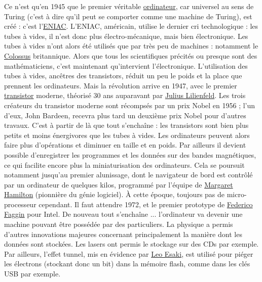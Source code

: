 \documentclass[10pt]{article}
\begin{document}
Ce n'est qu'en 1945 que le premier véritable \href{https://fr.wikipedia.org/wiki/Ordinateur}{ordinateur},
car universel au sens de Turing (c'est à dire qu'il peut se comporter comme une machine de Turing),
est créé : c'est l'\href{https://fr.wikipedia.org/wiki/ENIAC}{ENIAC}. L'ENIAC, américain, utilise le dernier cri technologique : les tubes à vides, il n'est
donc plus électro-mécanique, mais bien électronique. Les tubes à vides n'ont alors été utilisés que par très peu de machines : notamment
le \href{https://fr.wikipedia.org/wiki/Colossus_(ordinateur)}{Colossus} britannique.
Alors que tous les scientifiques précités ou presque sont des mathématiciens, c'est maintenant qu'intervient l'électronique.
L'utilisation des tubes à vides, ancêtres des transistors, réduit un peu le poids et la place que prennent les ordinateurs.
Mais la révolution arrive en 1947, avec le premier \href{https://fr.wikipedia.org/wiki/Transistor}{transistor} moderne, théorisé 30 ans auparavant
par \href{https://fr.wikipedia.org/wiki/Julius_Edgar_Lilienfeld}{Julius Lilienfeld}. Les trois créateurs du transistor moderne sont
récompsés par un prix Nobel en 1956 ; l'un d'eux, John Bardeen, recevra plus tard un deuxième prix Nobel pour d'autres travaux.
C'est à partir de là que tout s'enchaîne : les transistors sont bien plus petits et moins énergivores que les tubes à vides. Les ordinateurs peuvent
alors faire plus d'opérations et diminuer en taille et en poids.
Par ailleurs il devient possible d'enregistrer les programmes et les données sur des bandes magnétiques, ce qui facilite encore plus la miniaturisation
des ordinateurs. Cela se poursuit notamment jusqu'au premier
alunissage, dont le navigateur de bord est contrôlé par un ordinateur de quelques kilos,
programmé par l'équipe de \href{https://fr.wikipedia.org/wiki/Margaret_Hamilton_(scientifique)}{Margaret Hamilton} (pionnière du génie logiciel).
À cette époque, toujours pas de micro-processeur cependant. Il faut attendre 1972, et le premier prototype de
\href{https://fr.wikipedia.org/wiki/Federico_Faggin}{Federico Faggin} pour Intel. De nouveau tout s'enchaîne ... l'ordinateur va
devenir une machine pouvant être possédée par des particuliers.
La physique a permis d'autres innovations majeures concernant principalement la manière dont les données sont stockées. Les lasers ont permis
le stockage sur des CDs par exemple. Par ailleurs, l'effet tunnel, mis en évidence par \href{https://fr.wikipedia.org/wiki/Leo_Esaki}{Leo Esaki},
est utilisé pour piéger les électrons (stockant donc un bit) dans la mémoire flash, comme dans les clés USB par exemple.
\end{document}
